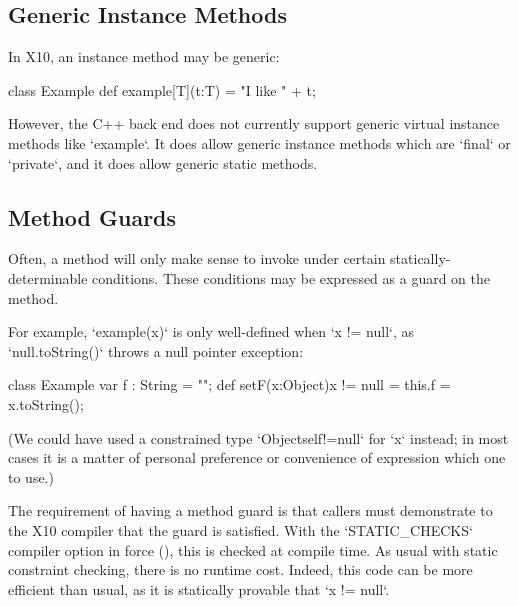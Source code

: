 \subsection{Generic Instance Methods}

\limitationx{}
In X10, an instance method may be generic: 
\begin{xten}
class Example {
  def example[T](t:T) = "I like " + t;
}
\end{xten}
%

However, the C++ back end does not currently support generic virtual instance
methods like \xcd`example`.  It does allow generic instance methods which are
\xcd`final` or \xcd`private`, and it does allow generic static methods.  


\subsection{Method Guards}
\label{MethodGuard}

Often, a method will only make sense to invoke under certain
statically-determinable conditions.  These conditions may be expressed as a
guard on the method.

\begin{ex}
For example, \xcd`example(x)` is only
well-defined when \xcd`x != null`, as \xcd`null.toString()` throws a null
pointer exception: 
% 
\begin{xten}
class Example {
   var f : String = "";
   def setF(x:Object){x != null} = {
      this.f = x.toString();
   }
}
\end{xten}
%
\noindent
(We could have used a constrained type \xcd`Object{self!=null}` for \xcd`x`
instead; in
most cases it is a matter of personal preference or convenience of expression
which one to use.) 
\end{ex}


The requirement of having a method guard 
is that callers must demonstrate to
the X10
compiler that the guard is satisfied.  
With the \xcd`STATIC_CHECKS` compiler option in force (), this is
checked at compile time. 
As usual with static constraint
checking, there is no runtime cost.  Indeed, this code can be more efficient
than usual, as it is statically provable that \xcd`x != null`.

